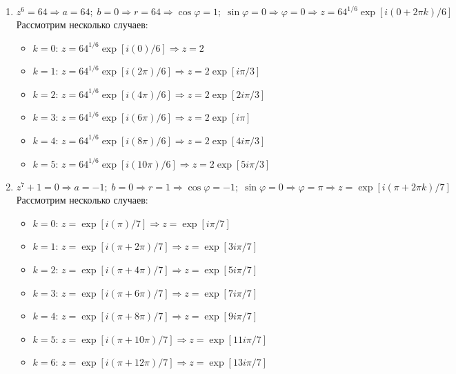 \documentclass{report}
\begin{document}
\begin{enumerate}
\item $z^6=64 \Rightarrow a=64;\; b=0 \Rightarrow r=64 \Rightarrow \cos{\varphi}=1;\; \sin{\varphi}=0 \Rightarrow \varphi=0 \Rightarrow z=64^{1/6}
	\exp{\left[i(0+2\pi k)/6\right]}$\\
	Рассмотрим несколько случаев:
	\begin{itemize}
		\item $k=0$: $z=64^{1/6}\exp{\left[i(0)/6\right]} \Rightarrow z=2$
		\item $k=1$: $z=64^{1/6}\exp{\left[i(2\pi)/6\right]} \Rightarrow z=2\exp{\left[i\pi/3\right]}$
		\item $k=2$: $z=64^{1/6}\exp{\left[i(4\pi)/6\right]} \Rightarrow z=2\exp{\left[2i\pi/3\right]}$
		\item $k=3$: $z=64^{1/6}\exp{\left[i(6\pi)/6\right]} \Rightarrow z=2\exp{\left[i\pi\right]}$
		\item $k=4$: $z=64^{1/6}\exp{\left[i(8\pi)/6\right]} \Rightarrow z=2\exp{\left[4i\pi/3\right]}$
		\item $k=5$: $z=64^{1/6}\exp{\left[i(10\pi)/6\right]} \Rightarrow z=2\exp{\left[5i\pi/3\right]}$
	\end{itemize}
\item $z^7+1=0 \Rightarrow a=-1;\; b=0 \Rightarrow r=1 \Rightarrow \cos{\varphi}=-1;\; \sin{\varphi}=0 \Rightarrow \varphi=\pi \Rightarrow z=\exp{\left[i(\pi+2\pi k)/7\right]}$\\
	Рассмотрим несколько случаев:
	\begin{itemize}
		\item $k=0$: $z=\exp{\left[i(\pi)/7\right]} \Rightarrow z=\exp{\left[i\pi/7\right]}$
		\item $k=1$: $z=\exp{\left[i(\pi+2\pi)/7\right]} \Rightarrow z=\exp{\left[3i\pi/7\right]}$
		\item $k=2$: $z=\exp{\left[i(\pi+4\pi)/7\right]} \Rightarrow z=\exp{\left[5i\pi/7\right]}$
		\item $k=3$: $z=\exp{\left[i(\pi+6\pi)/7\right]} \Rightarrow z=\exp{\left[7i\pi/7\right]}$
		\item $k=4$: $z=\exp{\left[i(\pi+8\pi)/7\right]} \Rightarrow z=\exp{\left[9i\pi/7\right]}$
		\item $k=5$: $z=\exp{\left[i(\pi+10\pi)/7\right]} \Rightarrow z=\exp{\left[11i\pi/7\right]}$
		\item $k=6$: $z=\exp{\left[i(\pi+12\pi)/7\right]} \Rightarrow z=\exp{\left[13i\pi/7\right]}$
	\end{itemize}
\end{enumerate}
\end{document}
